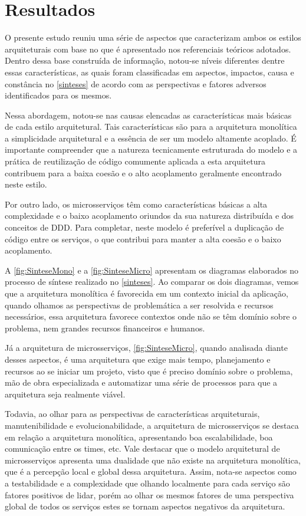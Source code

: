 \chapter{Resultados}

O presente estudo reuniu uma série de aspectos que caracterizam ambos os estilos arquiteturais com
base no que é apresentado nos referenciais teóricos adotados. Dentro dessa base construída de
informação, notou-se níveis diferentes dentre essas características, as quais foram classificadas em
aspectos, impactos, causa e constância no \autoref{sinteses} de acordo com as perspectivas e fatores
adversos identificados para os mesmos.

Nessa abordagem, notou-se nas causas elencadas as características mais básicas de cada estilo
arquitetural. Tais características são para a arquitetura monolítica a simplicidade arquitetural e a
essência de ser um modelo altamente acoplado. É importante compreender que a natureza tecnicamente
estruturada do modelo e a prática de reutilização de código comumente aplicada a esta arquitetura
contribuem para a baixa coesão e o alto acoplamento geralmente encontrado neste estilo.

Por outro lado, os microsserviços têm como características básicas a alta complexidade e o baixo
acoplamento oriundos da sua natureza distribuída e dos conceitos de \gls{DDD}. Para completar, neste
modelo é preferível a duplicação de código entre os serviços, o que contribui para manter a alta
coesão e o baixo acoplamento.

A \autoref{fig:SinteseMono} e a \autoref{fig:SinteseMicro} apresentam os diagramas elaborados no
processo de síntese realizado no \autoref{sinteses}. Ao comparar os dois diagramas, vemos que a arquitetura
monolítica é favorecida em um contexto inicial da aplicação, quando olhamos as perspectivas de
problemática a ser resolvida e recursos necessários, essa arquitetura favorece contextos onde não se
têm domínio sobre o problema, nem grandes recursos financeiros e humanos.

Já a arquitetura de microsserviços, \autoref{fig:SinteseMicro}, quando analisada diante
desses aspectos, é uma arquitetura que exige mais tempo, planejamento e recursos ao se iniciar um
projeto, visto que é preciso domínio sobre o problema, mão de obra especializada e
automatizar uma série de processos para que a arquitetura seja realmente viável.

Todavia, ao olhar para as perspectivas de características arquiteturais, manutenibilidade e
evolucionabilidade, a arquitetura de microsserviços se destaca em relação a arquitetura monolítica,
apresentando boa escalabilidade, boa comunicação entre os times, etc. Vale destacar que o modelo
arquitetural de microsserviços apresenta uma dualidade que não existe na arquitetura monolítica,
que é a percepção local e global dessa arquitetura. Assim, nota-se aspectos como a testabilidade e a
complexidade que olhando localmente para cada serviço são fatores positivos de lidar, porém ao
olhar os mesmos fatores de uma perspectiva global de todos os serviços estes se tornam aspectos
negativos da arquitetura.

